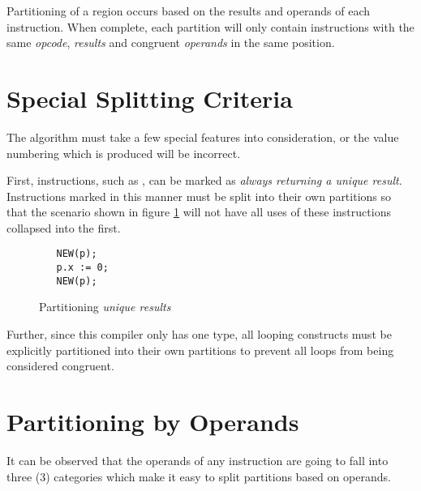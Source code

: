 Partitioning of a region occurs based on the results and operands of
each instruction.  When complete, each partition will only contain
instructions with the same \emph{opcode}, \emph{results} and congruent
\emph{operands} in the same position.

\section{Special Splitting Criteria}

The algorithm must take a few special features into consideration, or
the value numbering which is produced will be incorrect.

First, instructions, such as , can be marked as
\emph{always returning a unique result}.  Instructions marked in this
manner must be split into their own partitions so that the scenario
shown in figure \ref{fig:unique-results} will not have all uses of
these instructions collapsed into the first.

\begin{figure}[h!]
\begin{verbatim}
   NEW(p);
   p.x := 0;
   NEW(p);
\end{verbatim}
  \caption{Partitioning \emph{unique results}}\label{fig:unique-results}
\end{figure}

Further, since this compiler only has one  type, all
looping constructs must be explicitly partitioned into their own
partitions to prevent all loops from being considered congruent.

\section{Partitioning by Operands}
It can be observed that the operands of any instruction are going to
fall into three (3) categories which make it easy to split partitions
based on operands.

